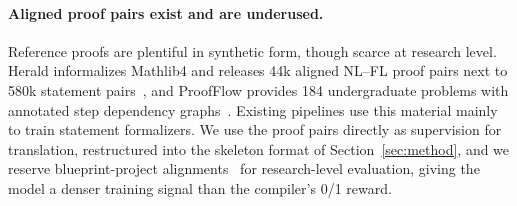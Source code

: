 \documentclass[sigconf,anonymous]{aamas}
\begin{document}

\paragraph{Aligned proof pairs exist and are underused.} Reference proofs are
plentiful in synthetic form, though scarce at research level. Herald
informalizes Mathlib4 and releases 44k aligned NL--FL proof pairs next to 580k
statement pairs~\citep{herald2025}, and ProofFlow provides 184 undergraduate
problems with annotated step dependency graphs~\citep{proofflow2025}. Existing
pipelines use this material mainly to train statement formalizers. We use the
proof pairs directly as supervision for translation, restructured into the
skeleton format of Section~\ref{sec:method}, and we reserve blueprint-project
alignments~\citep{rlmeval2025} for research-level evaluation, giving the model a
denser training signal than the compiler's 0/1 reward.

\end{document}
